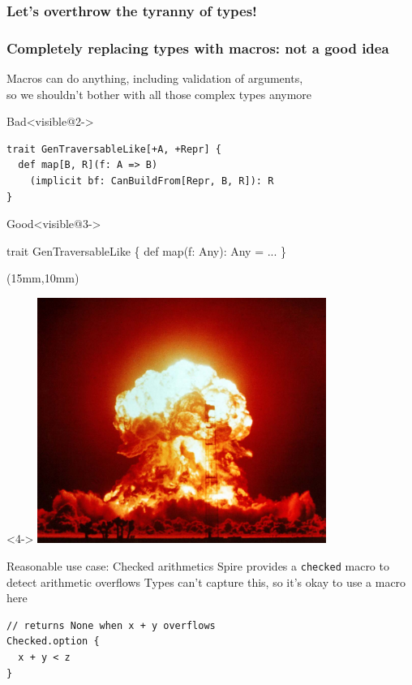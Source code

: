 \documentclass{beamer}
\begin{document}
\begin{frame}[fragile]
\frametitle<1>{Let's overthrow the tyranny of types!}
\frametitle<2>{Completely replacing types with macros: not a good idea}
  Macros can do anything, including validation of arguments,\\
  so we shouldn't bother with all those complex types anymore

  \vspace{1em}
  \begin{alertblock}{Bad}<visible@2->
    \begin{verbatim}
trait GenTraversableLike[+A, +Repr] {
  def map[B, R](f: A => B)
    (implicit bf: CanBuildFrom[Repr, B, R]): R
}
    \end{verbatim}
  \end{alertblock}
  \vskip-1cm

  \begin{exampleblock}{Good}<visible@3->
    \begin{semiverbatim}
trait GenTraversableLike \{
  def map(f: Any): Any = \text{\color{blue}{macro}} ...
\}
    \end{semiverbatim}
  \end{exampleblock}

  \begin{textblock*}{\textwidth}(15mm,10mm)
    \begin{visibleenv}<4->
      \includegraphics[height=8cm]{img/boom.jpg}
    \end{visibleenv}
  \end{textblock*}
\end{frame}

\begin{frame}[fragile]{Reasonable use case: Checked arithmetics}
  Spire provides a \texttt{checked} macro to detect arithmetic overflows
  Types can't capture this, so it's okay to use a macro here

  \vspace{1em}
  \begin{verbatim}
// returns None when x + y overflows
Checked.option {
  x + y < z
}
  \end{verbatim}
\end{frame}
\end{document}
